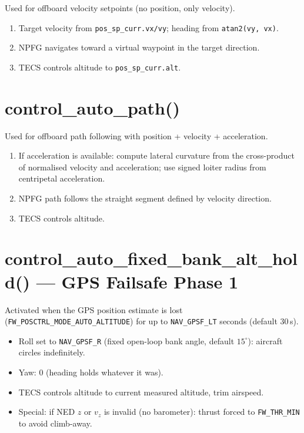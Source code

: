 \documentclass[12pt,a4paper]{article}
\begin{document}
Used for offboard velocity setpoints (no position, only velocity).

\begin{enumerate}
  \item Target velocity from \texttt{pos\_sp\_curr.vx/vy};
        heading from \texttt{atan2(vy, vx)}.
  \item NPFG navigates toward a virtual waypoint in the target direction.
  \item TECS controls altitude to \texttt{pos\_sp\_curr.alt}.
\end{enumerate}

\section{control\_auto\_path()}

Used for offboard path following with position + velocity + acceleration.

\begin{enumerate}
  \item If acceleration is available: compute lateral curvature from
        the cross-product of normalised velocity and acceleration;
        use signed loiter radius from centripetal acceleration.
  \item NPFG path follows the straight segment defined by
        velocity direction.
  \item TECS controls altitude.
\end{enumerate}

\section{control\_auto\_fixed\_bank\_alt\_hold() --- GPS Failsafe Phase 1}

Activated when the GPS position estimate is lost
(\texttt{FW\_POSCTRL\_MODE\_AUTO\_ALTITUDE}) for up to \texttt{NAV\_GPSF\_LT}
seconds (default 30\,s).

\begin{itemize}
  \item Roll set to \texttt{NAV\_GPSF\_R} (fixed open-loop bank angle,
        default $15^\circ$): aircraft circles indefinitely.
  \item Yaw: 0 (heading holds whatever it was).
  \item TECS controls altitude to current measured altitude, trim airspeed.
  \item Special: if NED $z$ or $v_z$ is invalid (no barometer):
        thrust forced to \texttt{FW\_THR\_MIN} to avoid climb-away.
\end{itemize}
\end{document}
